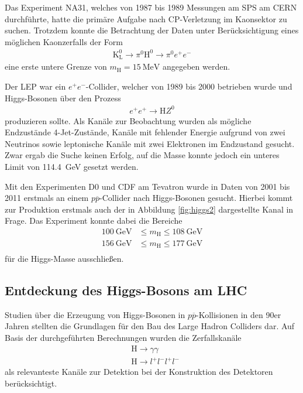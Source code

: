 
Das Experiment NA31, welches von 1987 bis 1989 Messungen am SPS am CERN durchführte, hatte die primäre Aufgabe nach CP-Verletzung im Kaonsektor zu suchen.
Trotzdem konnte die Betrachtung der Daten unter Berücksichtigung eines möglichen Kaonzerfalls der Form
\begin{align*}
	\text{K}_\text{L}^0 \rightarrow \pi^0 \text{H}^0 \rightarrow \pi^0 e^+ e^-
\end{align*}
eine erste untere Grenze von $m_\text{H} = \SI{15}{\mega\electronvolt}$ angegeben werden.

Der LEP war ein $e^+ e^-$-Collider, welcher von 1989 bis 2000 betrieben wurde und Higgs-Bosonen über den Prozess
\begin{align*}
	e^+ e^+ \rightarrow \text{H} Z^0
\end{align*}
produzieren sollte.
Als Kanäle zur Beobachtung wurden als mögliche Endzustände 4-Jet-Zustände, Kanäle mit fehlender Energie aufgrund von zwei Neutrinos sowie leptonische Kanäle mit zwei Elektronen im Endzustand gesucht.
Zwar ergab die Suche keinen Erfolg, auf die Masse konnte jedoch ein unteres Limit von \SI{114.4}{\giga\electronvolt} gesetzt werden.

Mit den Experimenten D0 und CDF am Tevatron wurde in Daten von 2001 bis 2011 erstmals an einem $p\overline{p}$-Collider nach Higgs-Bosonen gesucht.
Hierbei kommt zur Produktion erstmals auch der in Abbildung \ref{fig:higgs2} dargestellte Kanal in Frage.
Das Experiment konnte dabei die Bereiche
\begin{align*}
	\SI{100}{\giga\electronvolt} &\leq m_\text{H} \leq \SI{108}{\giga\electronvolt} \\
	\SI{156}{\giga\electronvolt} &\leq m_\text{H} \leq \SI{177}{\giga\electronvolt} \\
\end{align*}
für die Higgs-Masse ausschließen.

\subsection{Entdeckung des Higgs-Bosons am LHC}

Studien über die Erzeugung von Higgs-Bosonen in $p\overline{p}$-Kollisionen in den 90er Jahren stellten die Grundlagen für den Bau des Large Hadron Colliders dar.
Auf Basis der durchgeführten Berechnungen wurden die Zerfallskanäle
\begin{align*}
	&\text{H} \rightarrow \gamma \gamma \\
	&\text{H} \rightarrow l^+ l^- l^+ l^- 
\end{align*}
als relevanteste Kanäle zur Detektion bei der Konstruktion des Detektoren berücksichtigt.

